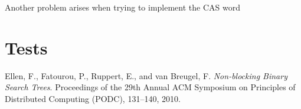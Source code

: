 \documentclass[a4paper,draft,12pt]{article}
\begin{document}
Another problem arises when trying to implement the CAS word

\section{Tests} %
\label{sec:tests}



\begin{thebibliography}{9}
     Ellen, F., Fatourou, P., Ruppert, E., and van Breugel, F. \emph{Non-blocking Binary Search Trees}. Proceedings of the 29th Annual ACM Symposium on Principles of Distributed Computing (PODC), 131–140, 2010.
\end{thebibliography}
\end{document}
